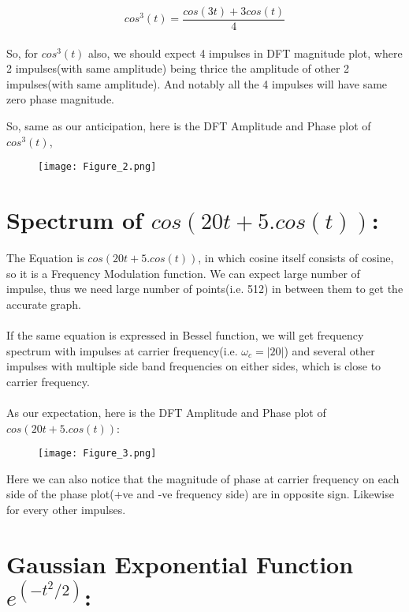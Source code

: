 \documentclass[12pt]{article}
\begin{document}
\begin{equation*}
cos^3(t) = \frac{cos(3t)+3cos(t)}{4}
\end{equation*}
\\
So, for $cos^3(t)$ also, we should expect 4 impulses in DFT magnitude plot, where 2 impulses(with same amplitude) being thrice the amplitude of other 2 impulses(with same amplitude). And notably all the 4 impulses will have same zero phase magnitude.

So, same as our anticipation, here is the DFT Amplitude and Phase plot of $cos^3(t)$, 
\begin{figure}[h!]
\centering
\texttt{[image: Figure\_2.png]}
\end{figure}

\newpage
\section*{Spectrum of $cos(20t +5.cos(t))$:}

The Equation is $cos(20t +5.cos(t))$, in which cosine itself consists of cosine, so it is a Frequency Modulation function. We can expect large number of impulse, thus we need large number of points(i.e. 512) in between them to get the accurate graph.\\\\

If the same equation is expressed in Bessel function, we will get frequency spectrum with impulses at carrier frequency(i.e. $\omega_{c}=|20|$) and several other impulses with multiple side band frequencies on either sides, which is close to carrier frequency.\\\\

 As our expectation, here is the DFT Amplitude and Phase plot of $cos(20t +5.cos(t))$:

\begin{figure}[h!]
\centering
\texttt{[image: Figure\_3.png]}
\label{fig:exemplo}
\end{figure}

Here we can also notice that the magnitude of phase at carrier frequency on each side of the phase plot(+ve and -ve frequency side) are in opposite sign. Likewise for every other impulses. 

\newpage
\section*{Gaussian Exponential Function   $e^{(-t^2/2)}$:}
\end{document}
